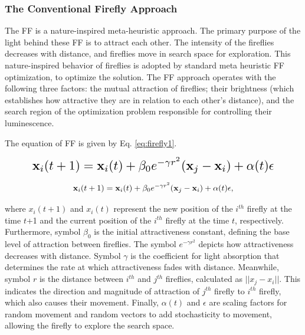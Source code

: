 \documentclass[journal]{IEEEtran}
\begin{document}
\subsubsection{The Conventional Firefly Approach}
The FF is a nature-inspired meta-heuristic approach. The primary purpose of the light behind these FF is to attract each other. The intensity of the fireflies decreases with distance, and fireflies move in search space for exploration. This nature-inspired behavior of fireflies is adopted by standard meta heuristic FF optimization, to optimize the solution. The FF approach operates with the following three factors: the mutual attraction of fireflies; their brightness (which establishes how attractive they are in relation to each other's distance), and the search region of the optimization problem responsible for controlling their luminescence. 


The equation of FF is given by Eq. \eqref{eq:firefly1}.

\textcolor{red}{
\begin{equation}\label{eq:firefly1}
    \resizebox{0.85\columnwidth}{!}{$
    \mathbf{x}_i(t+1) = \mathbf{x}_i(t) + \beta_0 e^{-\gamma r^2} (\mathbf{x}_j - \mathbf{x}_i) + \alpha(t)\mathbf{\epsilon}
    $}
\end{equation}}


\begin{equation}
\normalsize
\mathbf{x}_i(t+1) = \mathbf{x}_i(t) + \beta_0 e^{-\gamma r^2} (\mathbf{x}_j - \mathbf{x}_i) + \alpha(t) \mathbf{\epsilon},
\label{eq:firefly}
\end{equation}


where ${x}_i(t+1)$ and ${x}_i(t)$ represent the new position of the $i^{th}$ firefly at the time $t$+1 and the current position of the $i^{th}$ firefly at the time $t$, respectively. Furthermore, symbol $\beta_0$ is the initial attractiveness constant, defining the base level of attraction between fireflies. The symbol $e^{-\gamma r^2}$  depicts how attractiveness decreases with distance. Symbol $\gamma$ is the coefficient for light absorption that determines the rate at which attractiveness fades with distance. Meanwhile, symbol $r$ is the distance between $i^{th}$ and $j^{th}$ fireflies, calculated as $||{x}_j - {x}_i||$. This indicates the direction and magnitude of attraction of $j^{th}$ firefly to $i^{th}$ firefly, which also causes their movement. Finally, $\alpha(t)$ and ${\epsilon}$ are scaling factors for random movement and random vectors to add stochasticity to movement, allowing the firefly to explore the search space.
\end{document}
